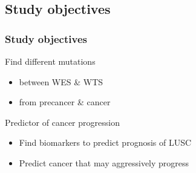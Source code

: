 \documentclass{beamer}
\begin{document}
        \subsection{Study objectives}
            \begin{frame}
                \frametitle{Study objectives}

                \begin{block}{Find different mutations}
                    \begin{itemize}
                        \item between WES \& WTS
                        \item from precancer \& cancer
                    \end{itemize}
                \end{block}

                \begin{exampleblock}{Predictor of cancer progression}
                    \begin{itemize}
                        \item Find biomarkers to predict prognosis of LUSC
                        \item Predict cancer that may aggressively progress
                    \end{itemize}
                \end{exampleblock}
            \end{frame}
\end{document}
